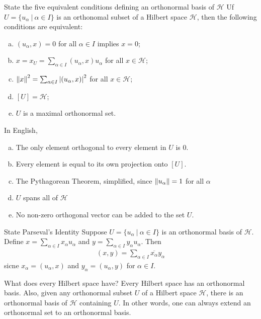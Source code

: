 \documentclass[avery5388,grid,frame]{flashcards}
\def\hilb{\mathcal{H}}
\begin{document}
\begin{flashcard}
    {State the five equivalent conditions defining an orthonormal basis of $\hilb$}
    Uf $U = \{u_\alpha\ |\ \alpha \in I\}$ is an orthonomal subset of a Hilbert space $\hilb$, then the following conditions are equivalent:
    \begin{enumerate}[(a)]
        \setlength{\itemsep}{-3pt}
        \item $(u_\alpha, x) = 0$ for all $\alpha \in I$ implies $x = 0$;
        \item $x = x_U = \sum_{\alpha \in I}(u_\alpha, x)u_\alpha$ for all $x \in \hilb$;
        \item $\norm{x}^2 = \sum_{\alpha \in I} \abs{(u_\alpha, x)}^2$ for all $x \in \hilb$;
        \item $[U] = \hilb$;
        \item $U$ is a maximal orthonormal set.
    \end{enumerate}
    In English,
    \begin{enumerate}[(a)]
        \setlength{\itemsep}{-3pt}
        \item The only element orthogonal to every element in $U$ is $0$.
        \item Every element is equal to its own projection onto $[U]$.
        \item The Pythagorean Theorem, simplified, since $\norm{u_\alpha} = 1$ for all $\alpha$
        \item $U$ spans all of $\hilb$
        \item No non-zero orthogonal vector can be added to the set $U$.
    \end{enumerate}
\end{flashcard}

\begin{flashcard}
    {State Parseval's Identity}
    Suppose $U = \{u_\alpha\ |\ \alpha \in I\}$ is an orthonormal basis of $\hilb$.  Define $x = \sum_{\alpha \in I} x_\alpha u_\alpha$ and $y = \sum_{\alpha \in I} y_\alpha u_\alpha$.  Then
    \begin{align*}
        (x, y) = \sum_{\alpha \in I}\overline{x_\alpha}y_\alpha
    \end{align*}
    sicne $x_\alpha = (u_\alpha, x)$ and $y_\alpha = (u_\alpha, y)$ for $\alpha \in I$.
\end{flashcard}

\begin{flashcard}
    {What does every Hilbert space have?}
    Every Hilbert space has an orthonormal basis.  Also, given any orthonormal subset $U$ of a Hilbert space $\hilb$, there is an orthonormal basis of $\hilb$ containing $U$.  In other words, one can always extend an orthonormal set to an orthonormal basis.
\end{flashcard}
\end{document}
